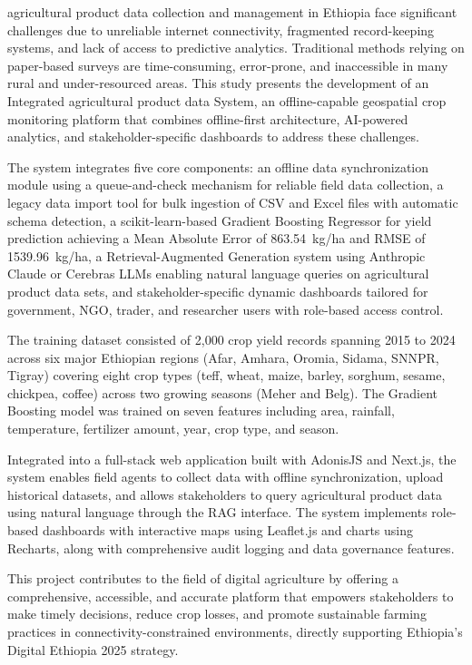 \documentclass[12pt,a4paper,oneside]{report}
\begin{document}
agricultural product data collection and management in Ethiopia face significant challenges due to unreliable internet connectivity, fragmented record-keeping systems, and lack of access to predictive analytics. Traditional methods relying on paper-based surveys are time-consuming, error-prone, and inaccessible in many rural and under-resourced areas. This study presents the development of an Integrated agricultural product data System, an offline-capable geospatial crop monitoring platform that combines offline-first architecture, AI-powered analytics, and stakeholder-specific dashboards to address these challenges.

The system integrates five core components: an offline data synchronization module using a queue-and-check mechanism for reliable field data collection, a legacy data import tool for bulk ingestion of CSV and Excel files with automatic schema detection, a scikit-learn-based Gradient Boosting Regressor for yield prediction achieving a Mean Absolute Error of 863.54~kg/ha and RMSE of 1539.96~kg/ha, a Retrieval-Augmented Generation system using Anthropic Claude or Cerebras LLMs enabling natural language queries on agricultural product data sets, and stakeholder-specific dynamic dashboards tailored for government, NGO, trader, and researcher users with role-based access control.

The training dataset consisted of 2,000 crop yield records spanning 2015 to 2024 across six major Ethiopian regions (Afar, Amhara, Oromia, Sidama, SNNPR, Tigray) covering eight crop types (teff, wheat, maize, barley, sorghum, sesame, chickpea, coffee) across two growing seasons (Meher and Belg). The Gradient Boosting model was trained on seven features including area, rainfall, temperature, fertilizer amount, year, crop type, and season.

Integrated into a full-stack web application built with AdonisJS and Next.js, the system enables field agents to collect data with offline synchronization, upload historical datasets, and allows stakeholders to query agricultural product data using natural language through the RAG interface. The system implements role-based dashboards with interactive maps using Leaflet.js and charts using Recharts, along with comprehensive audit logging and data governance features.

This project contributes to the field of digital agriculture by offering a comprehensive, accessible, and accurate platform that empowers stakeholders to make timely decisions, reduce crop losses, and promote sustainable farming practices in connectivity-constrained environments, directly supporting Ethiopia's Digital Ethiopia 2025 strategy.
\end{document}
